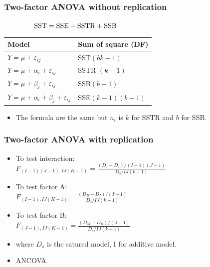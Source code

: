 \documentclass[10pt, french]{article}
\begin{document}
\begin{multicols*}{3}
\subsubsection*{Two-factor ANOVA without replication}
$\hspace*{1.5cm} \mathrm{SST} = \mathrm{SSE} + \mathrm{SSTR} + \mathrm{SSB}$
   \begin{center}
      \begin{tabular}{ll}
        \hline
        Model & Sum of square (DF) \\
        \hline
         $Y = \mu + \varepsilon_{ij}$ & SST$(bk-1)$  \\
         $Y = \mu + \alpha_i + \varepsilon_{ij}$ & SSTR $(k-1)$ \\
         $Y = \mu + \beta_j + \varepsilon_{ij}$ &SSB$(b-1)$ \\
         $Y = \mu +\alpha_i +  \beta_j + \varepsilon_{ij}$ & SSE$(k-1)(b-1)$  \\
         \hline
      \end{tabular} 
   \end{center} 
\begin{itemize}[align=left,leftmargin=*]
  \item The formula are the same but $n_i$ is $k$ for SSTR and $b$ for SSB. 
\end{itemize}
\subsubsection*{Two-factor ANOVA with replication}
\begin{itemize}[align=left,leftmargin=*]
   \item To test interaction:\\
   $F_{(I-1)(J-1),IJ(K-1)} = \frac{(D_I - D_s)/(I-1)(J-1)}{D_s/IJ(k-1)}$ 
   \item To test factor A:\\
   $F_{(I-1),IJ(K-1)} = \frac{(D_B - D_I)/(I-1)}{D_s/IJ(k-1)}$ 
   \item To test factor B: \\
   $F_{(J-1),IJ(K-1)} = \frac{(D_M - D_B)/(J-1)}{D_s/IJ(k-1)}$ 
   \item[] where $D_s$ is the satured model, I for additive model.
   \item ANCOVA
\end{itemize}



\end{multicols*}
\end{document}
